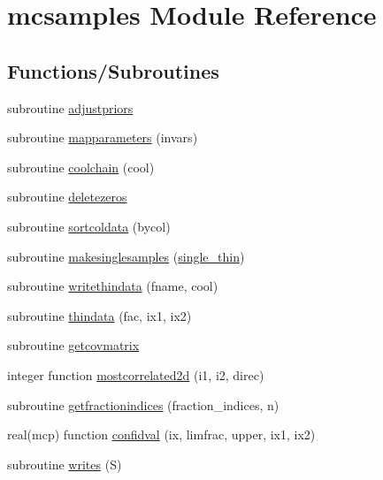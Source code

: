 \hypertarget{namespacemcsamples}{}\section{mcsamples Module Reference}
\label{namespacemcsamples}
\subsection*{Functions/\+Subroutines}
\begin{DoxyCompactItemize}
\item 
subroutine \mbox{\hyperlink{namespacemcsamples_aa4af8bb5067761fcc26783a3198edb1a}{adjustpriors}}
\item 
subroutine \mbox{\hyperlink{namespacemcsamples_ac831b94ceae7c808b2656230727e6cdd}{mapparameters}} (invars)
\item 
subroutine \mbox{\hyperlink{namespacemcsamples_a415388e77f0a5360c5a814c8ba0e4080}{coolchain}} (cool)
\item 
subroutine \mbox{\hyperlink{namespacemcsamples_a35bad035408957649f1a00bc87bc798c}{deletezeros}}
\item 
subroutine \mbox{\hyperlink{namespacemcsamples_af00e1e65ba0440ba9f05136bb9219f55}{sortcoldata}} (bycol)
\item 
subroutine \mbox{\hyperlink{namespacemcsamples_a1e8b234ac939c21f51884cab29fd0204}{makesinglesamples}} (\mbox{\hyperlink{namespacemcsamples_a39de2461adb48b31033a95a7d14666be}{single\+\_\+thin}})
\item 
subroutine \mbox{\hyperlink{namespacemcsamples_a98999c53910240226ec96e8ef0751a22}{writethindata}} (fname, cool)
\item 
subroutine \mbox{\hyperlink{namespacemcsamples_ad5ab7ed94d3a34782ce86ebc0d23e148}{thindata}} (fac, ix1, ix2)
\item 
subroutine \mbox{\hyperlink{namespacemcsamples_a3b127162be572d0864c8bd49f3403a78}{getcovmatrix}}
\item 
integer function \mbox{\hyperlink{namespacemcsamples_ac9c93f48a6a5f4c22e5f35b060bcab20}{mostcorrelated2d}} (i1, i2, direc)
\item 
subroutine \mbox{\hyperlink{namespacemcsamples_a45291f5f8d4db1ad22598222a511e67c}{getfractionindices}} (fraction\+\_\+indices, n)
\item 
real(mcp) function \mbox{\hyperlink{namespacemcsamples_affe201ec04f01f217a706350334d21e4}{confidval}} (ix, limfrac, upper, ix1, ix2)
\item 
subroutine \mbox{\hyperlink{namespacemcsamples_a54c3f403eb92b30ff78476abea37462c}{writes}} (S)

\end{DoxyCompactItemize}
